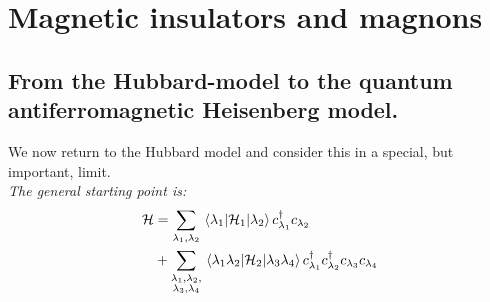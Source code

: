 \chapter{Magnetic insulators and magnons}

\section{From the Hubbard-model to the quantum antiferromagnetic Heisenberg model.}

We now return to the Hubbard model and consider this in a special, but important, limit.\\

\emph{The general starting point is:}
\begin{align}
	\begin{split}
		\mathcal{H} &= \sum_{\lambda_1,\lambda_2} \mel{\lambda_1}{\mathcal{H}_1}{\lambda_2}c_{\lambda_1}^{\dagger} c_{\lambda_2} \\
		&+ \sum_{\substack{\lambda_1, \lambda_2, \\
				\lambda_3, \lambda_4}} \mel{\lambda_1 \lambda_2}{\mathcal{H}_2}{\lambda_3 \lambda_4}c_{\lambda_1}^\dagger c_{\lambda_2}^\dagger c_{\lambda_3} c_{\lambda_4}
	\end{split}
\end{align}

